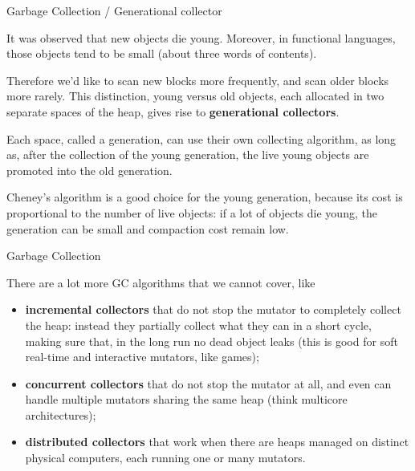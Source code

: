 \documentclass[compress,dvipdfmx]{beamer}
\begin{document}
%
\begin{frame}{Garbage Collection / Generational collector}

  It was observed that new objects die young. Moreover, in functional
  languages, those objects tend to be small (about three words of
  contents).

  \bigskip

  Therefore we'd like to scan new blocks more frequently, and scan
  older blocks more rarely. This distinction, young versus old
  objects, each allocated in two separate spaces of the heap, gives
  rise to \textbf{generational collectors}.

  \bigskip

  Each space, called a generation, can use their own collecting
  algorithm, as long as, after the collection of the young generation,
  the live young objects are promoted into the old generation.

  \bigskip

  Cheney's algorithm is a good choice for the young generation,
  because its cost is proportional to the number of live objects: if a
  lot of objects die young, the generation can be small and compaction
  cost remain low.

\end{frame}

%
\begin{frame}{Garbage Collection}

  There are a lot more GC algorithms that we cannot cover, like
  \begin{itemize}

    \item \textbf{incremental collectors} that do not stop the mutator
      to completely collect the heap: instead they partially collect
      what they can in a short cycle, making sure that, in the long
      run no dead object leaks (this is good for soft real\hyp{}time
      and interactive mutators, like games);

    \item \textbf{concurrent collectors} that do not stop the mutator
      at all, and even can handle multiple mutators sharing the same
      heap (think multicore architectures);

    \item \textbf{distributed collectors} that work when there are
      heaps managed on distinct physical computers, each running one
      or many mutators.

  \end{itemize}

\end{frame}
\end{document}
